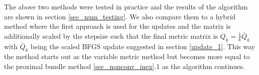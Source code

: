 
%
%

The above two methods were tested in practice and the results of the algorithm are shown in section \ref{sec_num_testing}. We also compare them to a hybrid method where the first approach is used for the updates and the matrix is additionally scaled by the stepsize such that the final metric matrix is \(Q_k = \frac{1}{k}\bar{Q}_k\) with \(\bar{Q}_k\) being the scaled BFGS update suggested in section \ref{update_1}. This way the method starts out as the variable metric method but becomes more equal to the proximal bundle method \ref{sec_nonconv_inex}.1 as the algorithm continues.

